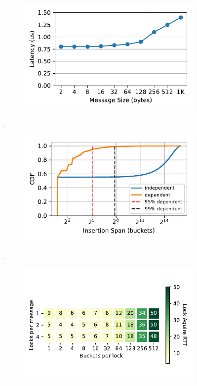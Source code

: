 \begin{figure}[t]
    \centering
    \begin{subfigure}{0.3\linewidth}
        \includegraphics[width=0.99\linewidth]{fig/rdma_latency.pdf}
        \label{fig:rdma_latency}
    \end{subfigure}.
    \begin{subfigure}{0.3\linewidth}
        \includegraphics[width=0.99\linewidth]{fig/insertion_span.pdf}
        \label{fig:insertion_span}
    \end{subfigure}.
    \begin{subfigure}{0.3\linewidth}
        \includegraphics[width=0.99\linewidth]{fig/buckets_per_lock_vs_locks_per_message.pdf}

\end{subfigure}
\end{figure}
